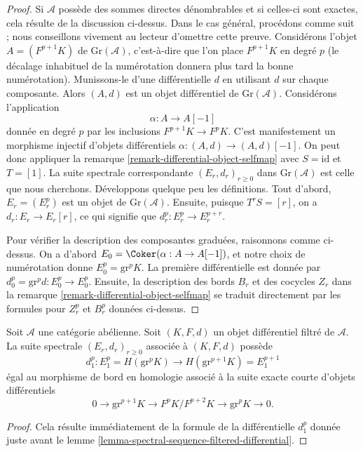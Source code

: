 \begin{proof}
Si $\mathcal{A}$ possède des sommes directes dénombrables et si celles-ci
sont exactes, cela résulte de la discussion ci-dessus.
Dans le cas général, procédons comme suit ; nous conseillons vivement au lecteur
d'omettre cette preuve. Considérons l'objet $A = (F^{p + 1}K)$ de
$\text{Gr}(\mathcal{A})$, c'est-à-dire que l'on place $F^{p + 1}K$ en degré $p$
(le décalage inhabituel de la numérotation donnera plus tard la bonne numérotation).
Munissons-le d'une différentielle $d$ en utilisant $d$ sur chaque composante.
Alors $(A, d)$ est un objet différentiel de $\text{Gr}(\mathcal{A})$.
Considérons l'application
$$
\alpha : A \to A[-1]
$$
donnée en degré $p$ par les inclusions $F^{p + 1}K \to F^pK$.
C'est manifestement un morphisme injectif d'objets différentiels
$\alpha : (A, d) \to (A, d)[-1]$. On peut donc appliquer la
remarque \ref{remark-differential-object-selfmap}
avec $S = \text{id}$ et $T = [1]$.
La suite spectrale correspondante $(E_r, d_r)_{r \geq 0}$
dans $\text{Gr}(\mathcal{A})$ est celle que nous cherchons.
Développons quelque peu les définitions.
Tout d'abord, $E_r = (E_r^p)$ est un objet de $\text{Gr}(\mathcal{A})$.
Ensuite, puisque $T^rS = [r]$, on a $d_r : E_r \to E_r[r]$, ce qui signifie que
$d_r^p : E_r^p \to E_r^{p + r}$.

\medskip\noindent
Pour vérifier la description des composantes graduées, raisonnons
comme ci-dessus. On a d'abord $E_0 = \Coker(\alpha : A \to A[-1])$,
et notre choix de numérotation donne
$E_0^p = \text{gr}^pK$. La première différentielle est donnée par
$d_0^p = \text{gr}^pd : E_0^p \to E_0^p$.
Ensuite, la description des bords $B_r$ et des cocycles $Z_r$
dans la remarque \ref{remark-differential-object-selfmap}
se traduit directement par les formules
pour $Z_r^p$ et $B_r^p$ données ci-dessus.
\end{proof}

\begin{lemma}
\label{lemma-spectral-sequence-filtered-differential-d1}
Soit $\mathcal{A}$ une catégorie abélienne. Soit $(K, F, d)$ un objet
différentiel filtré de $\mathcal{A}$. La suite spectrale
$(E_r, d_r)_{r \geq 0}$ associée à $(K, F, d)$ possède
$$
d_1^p :
E_1^p = H(\text{gr}^pK)
\longrightarrow
H(\text{gr}^{p + 1}K) = E_1^{p + 1}
$$
égal au morphisme de bord en homologie associé à la suite
exacte courte d'objets différentiels
$$
0 \to \text{gr}^{p + 1}K \to F^pK/F^{p + 2}K \to \text{gr}^pK \to 0.
$$
\end{lemma}

\begin{proof}
Cela résulte immédiatement de la formule de la différentielle $d_1^p$
donnée juste avant le lemme \ref{lemma-spectral-sequence-filtered-differential}.
\end{proof}

